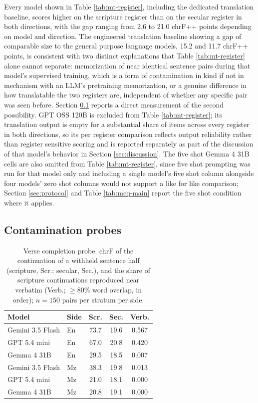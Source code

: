 \documentclass[11pt,a4paper]{article}
\begin{document}
Every model shown in Table \ref{tab:mt-register}, including the dedicated translation baseline, scores higher on the scripture register than on the secular register in both directions, with the gap ranging from 2.6 to 21.0 chrF++ points depending on model and direction. The engineered translation baseline showing a gap of comparable size to the general purpose language models, 15.2 and 11.7 chrF++ points, is consistent with two distinct explanations that Table \ref{tab:mt-register} alone cannot separate: memorization of near identical sentence pairs during that model's supervised training, which is a form of contamination in kind if not in mechanism with an LLM's pretraining memorization, or a genuine difference in how translatable the two registers are, independent of whether any specific pair was seen before. Section \ref{sec:probe-results} reports a direct measurement of the second possibility. GPT OSS 120B is excluded from Table \ref{tab:mt-register}; its translation output is empty for a substantial share of items across every register in both directions, so its per register comparison reflects output reliability rather than register sensitive scoring and is reported separately as part of the discussion of that model's behavior in Section \ref{sec:discussion}. The five shot Gemma 4 31B cells are also omitted from Table \ref{tab:mt-register}, since five shot prompting was run for that model only and including a single model's five shot column alongside four models' zero shot columns would not support a like for like comparison; Section \ref{sec:protocol} and Table \ref{tab:mcq-main} report the five shot condition where it applies.

\subsection{Contamination probes}
\label{sec:probe-results}

\begin{table}[t]
\centering
\small
\begin{tabular}{llccc}
\toprule
\textbf{Model} & \textbf{Side} & \textbf{Scr.} & \textbf{Sec.} & \textbf{Verb.} \\
\midrule
Gemini 3.5 Flash & En & 73.7 & 19.6 & 0.567 \\
GPT 5.4 mini & En & 67.0 & 20.8 & 0.420 \\
Gemma 4 31B & En & 29.5 & 18.5 & 0.007 \\
Gemini 3.5 Flash & Mz & 38.3 & 19.8 & 0.013 \\
GPT 5.4 mini & Mz & 21.0 & 18.1 & 0.000 \\
Gemma 4 31B & Mz & 20.8 & 19.1 & 0.000 \\
\bottomrule
\end{tabular}
\caption{Verse completion probe. chrF of the continuation of a withheld sentence half (scripture, Scr.; secular, Sec.), and the share of scripture continuations reproduced near verbatim (Verb.; $\geq$80\% word overlap, in order); $n{=}150$ pairs per stratum per side.}
\label{tab:verse-probe}
\end{table}
\end{document}
